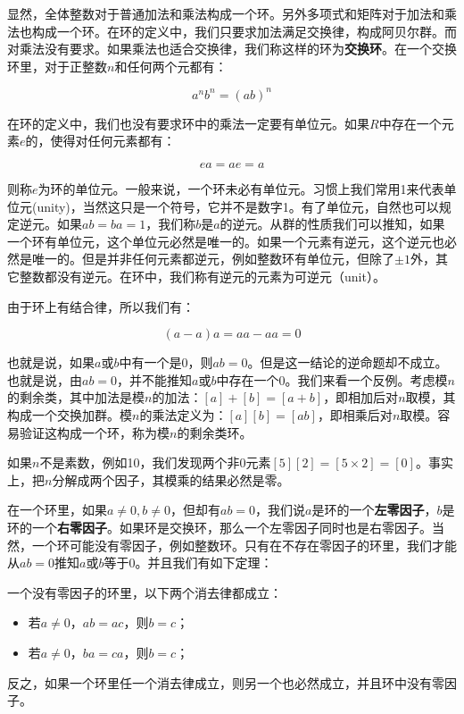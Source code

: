 \documentclass{article}
\begin{document}
显然，全体整数对于普通加法和乘法构成一个环。另外多项式和矩阵对于加法和乘法也构成一个环。在环的定义中，我们只要求加法满足交换律，构成阿贝尔群。而对乘法没有要求。如果乘法也适合交换律，我们称这样的环为\textbf{交换环}。在一个交换环里，对于正整数$n$和任何两个元都有：

\[
a^nb^n = (ab)^n
\]

在环的定义中，我们也没有要求环中的乘法一定要有单位元。如果$R$中存在一个元素$e$的，使得对任何元素都有：

\[
ea = ae = a
\]

则称$e$为环的单位元。一般来说，一个环未必有单位元。习惯上我们常用1来代表单位元(unity)，当然这只是一个符号，它并不是数字1。有了单位元，自然也可以规定逆元。如果$ab = ba = 1$，我们称$b$是$a$的逆元。从群的性质我们可以推知，如果一个环有单位元，这个单位元必然是唯一的。如果一个元素有逆元，这个逆元也必然是唯一的。但是并非任何元素都逆元，例如整数环有单位元，但除了$\pm 1$外，其它整数都没有逆元。在环中，我们称有逆元的元素为可逆元（unit）。

由于环上有结合律，所以我们有：

\[
(a - a)a = aa - aa = 0
\]

也就是说，如果$a$或$b$中有一个是0，则$ab = 0$。但是这一结论的逆命题却不成立。也就是说，由$ab = 0$，并不能推知$a$或$b$中存在一个0。我们来看一个反例。考虑模$n$的剩余类，其中加法是模$n$的加法：$[a] + [b] = [a + b]$，即相加后对$n$取模，其构成一个交换加群。模$n$的乘法定义为：$[a][b] = [ab]$，即相乘后对$n$取模。容易验证这构成一个环，称为模$n$的剩余类环。

如果$n$不是素数，例如10，我们发现两个非0元素$[5][2] = [5 \times 2] = [0]$。事实上，把$n$分解成两个因子，其模乘的结果必然是零。

在一个环里，如果$a \neq 0, b \neq 0$，但却有$ab = 0$，我们说$a$是环的一个\textbf{左零因子}，$b$是环的一个\textbf{右零因子}。如果环是交换环，那么一个左零因子同时也是右零因子。当然，一个环可能没有零因子，例如整数环。只有在不存在零因子的环里，我们才能从$ab = 0$推知$a$或$b$等于0。并且我们有如下定理：

\begin{theorem}
一个没有零因子的环里，以下两个消去律都成立：
\begin{itemize}
\item 若$a \neq 0$，$ab = ac$，则$b = c$；
\item 若$a \neq 0$，$ba = ca$，则$b = c$；
\end{itemize}
\end{theorem}

反之，如果一个环里任一个消去律成立，则另一个也必然成立，并且环中没有零因子。
\end{document}
